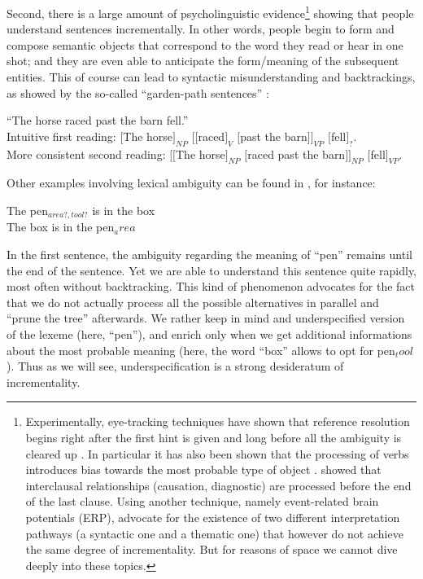 \documentclass[11pt]{article}
\begin{document}
				Second, there is a large amount of psycholinguistic evidence\footnote{Experimentally, eye-tracking techniques have shown that reference resolution begins right after the first hint is given and long before all the ambiguity is cleared up \cite{tanenhaus1996}. In particular it has also been shown that the processing of verbs introduces bias towards the most probable type of object \cite{altmann1999}. \cite{traxler1997} showed that interclausal relationships (causation, diagnostic) are processed before the end of the last clause. Using another technique, namely event-related brain potentials (ERP), \cite{schlesewsky2004} advocate for the existence of two different interpretation pathways (a syntactic one and a thematic one) that however do not achieve the same degree of incrementality. But for reasons of space we cannot dive deeply into these topics.} showing that people understand sentences incrementally. In other words, people begin to form and compose semantic objects that correspond to the word they read or hear in one shot; and they are even able to anticipate the form/meaning of the subsequent entities. This of course can lead to syntactic misunderstanding and backtrackings, as showed by the so-called ``garden-path sentences'' \cite{sag2015}:
				\begin{center}
					``The horse raced past the barn fell.'' \cite{bever2013}\vspace{1mm}\\
					Intuitive first reading: $[$The horse$]_{NP}$ $[ [$raced$]_V$ $[$past the barn$] ]_{VP}$ $[$fell$]_?$. \vspace{1mm}\\
					More consistent second reading: $[[$The horse$]_{NP}$ $[$raced past the barn$]]_{NP}$ $[$fell$]_{VP}$.\\
				\end{center}
				Other examples involving lexical ambiguity can be found in \cite{sag2015}, for instance:
				\begin{center}
					The pen$_{area?, tool?}$ is in the box \\
					The box is in the pen$_area$
				\end{center}
				In the first sentence, the ambiguity regarding the meaning of ``pen'' remains until the end of the sentence. Yet we are able to understand this sentence quite rapidly, most often without backtracking. This kind of phenomenon advocates for the fact that we do not actually process all the possible alternatives in parallel and ``prune the tree'' afterwards. We rather keep in mind and underspecified version of the lexeme (here, ``pen''), and enrich only when we get additional informations about the most probable meaning (here, the word ``box'' allows to opt for pen$_tool$). Thus as we will see, underspecification is a strong desideratum of incrementality.\\
				
\end{document}
